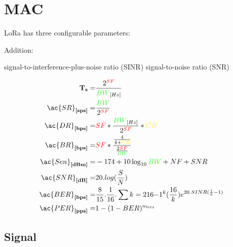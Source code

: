\chapter{MAC}


LoRa has three configurable parameters:

Addition:

signal-to-interference-plus-noise ratio (SINR)
signal-to-noise ratio (SNR)


\begin{align}
\textbf{T}_{\textbf{s}}=                             & \frac{2^{\red{SF}}}{\green{BW}_{[Hz]}}\\
\ac{SR}_{\textbf{[sps]}}=   & \frac{\green{BW}}{2^{\red{SF}}}\\
\ac{DR}_{\textbf{[bps]}}    =& \red{SF}*\frac{\green{BW}_{[Hz]}}{2^{\red{SF}}}*\yellow{CR}\\
\ac{BR}_{\textbf{[bps]}}    =& \red{SF} * \frac{\frac{4}{4+\yellow{CR}}}{\frac{2 \red{SF}}{\green{BW}}}\\
\ac{Sen}_{\textbf{[dBm]}} =& -174+10 \log _{10} \green{BW} + NF + SNR\\
\ac{SNR}_{\textbf{[dB]}} =& 20.log(\frac{S}{N})\\
\ac{BER}_{\textbf{[bps]}} =                       & \frac{8}{15}.\frac{1}{16}.\sum{k=2}{16}{-1^{k}(\frac{16}{k})e^{20.SINR(\frac{1}{k}-1)}}\\
\ac{PER}_{\textbf{[pps]}}=                     & 1-(1-BER)^{n_{bits}}\\
\end{align}


\section{Signal}

